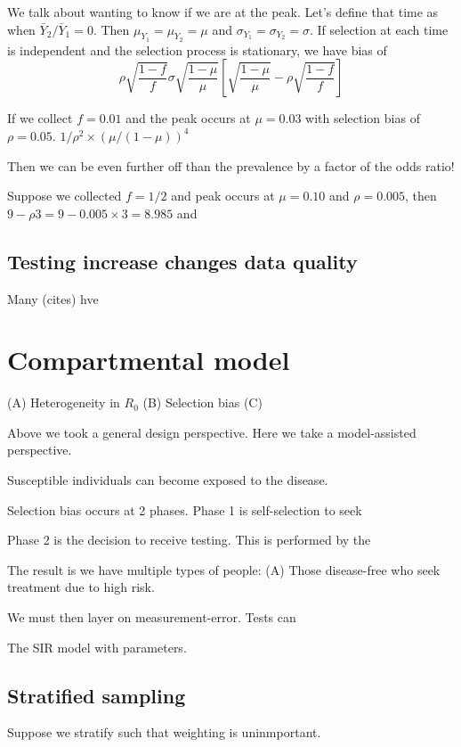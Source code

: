 \documentclass[12pt]{article}
\numberwithin{equation}{section}
\theoremstyle{plain}
\begin{document}
We talk about wanting to know if we are at the peak.  Let's define that time as when $\bar Y_2 / \bar Y_1 = 0$.  Then $\mu_{Y_1} = \mu_{Y_2} = \mu$ and $\sigma_{Y_1} = \sigma_{Y_2} = \sigma$. If selection at each time is independent and the selection process is stationary, we have bias of
$$
\rho \sqrt{\frac{1-f}{f}} \sigma \sqrt{\frac{1-\mu}{\mu}} \left[ \sqrt{\frac{1-\mu}{\mu}} - \rho \sqrt{\frac{1-f}{f}} \right ]
$$

If we collect $f = 0.01$ and the peak occurs at $\mu = 0.03$ with selection bias of $\rho = 0.05$. $1/\rho^2 \times (\mu/(1-\mu))^4$

Then we can be even further off than the prevalence by a factor of the odds ratio!

Suppose we collected $f=1/2$ and peak occurs at $\mu = 0.10$ and $\rho = 0.005$, then $9-\rho 3 = 9 - 0.005 \times 3 = 8.985$ and

\subsection{Testing increase changes data quality}

Many (cites) hve

\section{Compartmental model}

(A) Heterogeneity in $R_0$
(B) Selection bias
(C)

Above we took a general design perspective.  Here we take a model-assisted perspective.

Susceptible individuals can become exposed to the disease.

Selection bias occurs at 2 phases. Phase 1 is self-selection to seek

Phase 2 is the decision to receive testing.  This is performed by the

The result is we have multiple types of people: (A) Those disease-free who seek treatment due to high risk.

We must then layer on measurement-error.  Tests can

The SIR model with parameters.

\subsection{Stratified sampling}

Suppose we stratify such that weighting is uninmportant.
\end{document}
